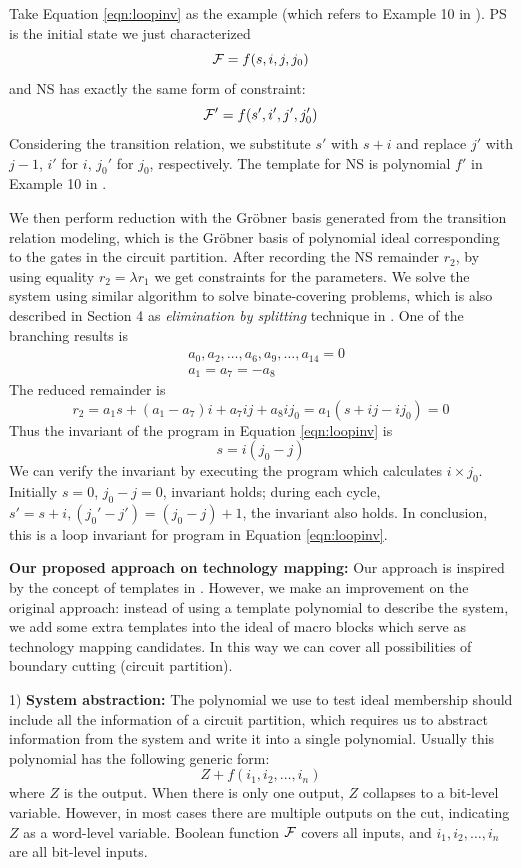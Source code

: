 Take Equation \ref{eqn:loopinv} as the example (which refers to Example 10 in \cite{sankaranarayanan2004non}). 
PS is the initial state we just characterized 
$${\mathcal{F}} = f(s,i,j,j_0)$$ 
and NS has exactly the same form of constraint:
$${\mathcal{F}}' = f(s',i',j',j_0')$$
Considering the transition relation, we substitute $s'$ with $s+i$ and replace $j'$
with $j-1$, $i'$ for $i$, $j_0'$ for $j_0$, respectively. 
The template for NS is polynomial $f'$ in Example 10 in \cite{sankaranarayanan2004non}.

We then perform reduction with the Gr\"obner basis generated from the transition relation modeling, 
which is the Gr\"obner basis of polynomial ideal corresponding to the gates in the circuit partition.
After recording the NS remainder $r_2$,
by using equality $r_2 = \lambda r_1$ we get constraints for the parameters. We solve the system using 
similar algorithm to solve binate-covering problems,
which is also described in Section 4 as \emph{elimination by splitting} technique in \cite{sankaranarayanan2004non}. 
One of the branching results is
\begin{align*}
&a_0,a_2,\dots, a_6, a_9,\dots,a_{14}=  0\\ 
&a_1=a_7=-a_8
\end{align*}
The reduced remainder is
$$r_2 = a_1s +(a_1-a_7)i+a_7ij+a_8ij_0 = a_1(s+ij-ij_0) = 0$$
Thus the invariant of the program in Equation \ref{eqn:loopinv} is
$$s = i(j_0- j)$$
We can verify the invariant by executing the program which calculates $i\times j_0$. 
Initially $s=0$, $j_0-j=0$, invariant holds;
during each cycle, $s'=s+i, (j_0'-j') = (j_0-j)+1$, the invariant also holds. In conclusion, this is a
loop invariant for program in Equation \ref{eqn:loopinv}.

{\bf Our proposed approach on technology mapping:}
Our approach is inspired by the concept of templates in \cite{sankaranarayanan2004non}. 
However, we make an improvement on the original approach:
instead of using a template polynomial to describe the system, we add some extra templates into the ideal
of macro blocks which serve as technology mapping candidates. In this way we can cover all possibilities
of boundary cutting (circuit partition).

1) {\bf System abstraction:}
The polynomial we use to test ideal membership should include all the information of a circuit partition,
which requires us to abstract information from the system and write it into a single polynomial.
Usually this polynomial has the following generic form:
$$Z + f(i_1,i_2,\dots,i_n)$$
where $Z$ is the output. When there is only one output, $Z$ collapses to a bit-level variable. However, in most
cases there are multiple outputs on the cut, indicating $Z$ as a word-level variable. Boolean function ${\mathcal{F}}$ covers
all inputs, and $i_1,i_2,\dots,i_n$ are all bit-level inputs.

